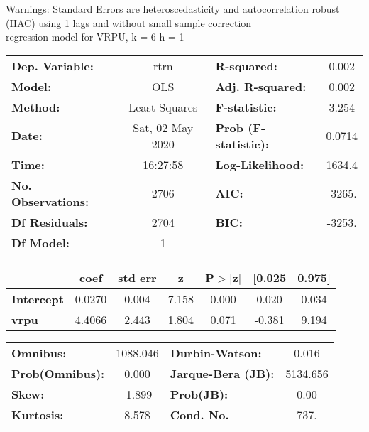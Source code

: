 Warnings: \newline
 [1] Standard Errors are heteroscedasticity and autocorrelation robust (HAC) using 1 lags and without small sample correction\\ 

regression model for VRPU, k = 6 h = 1\begin{center}
\begin{tabular}{lclc}
\toprule
\textbf{Dep. Variable:}    &       rtrn       & \textbf{  R-squared:         } &     0.002   \\
\textbf{Model:}            &       OLS        & \textbf{  Adj. R-squared:    } &     0.002   \\
\textbf{Method:}           &  Least Squares   & \textbf{  F-statistic:       } &     3.254   \\
\textbf{Date:}             & Sat, 02 May 2020 & \textbf{  Prob (F-statistic):} &   0.0714    \\
\textbf{Time:}             &     16:27:58     & \textbf{  Log-Likelihood:    } &    1634.4   \\
\textbf{No. Observations:} &        2706      & \textbf{  AIC:               } &    -3265.   \\
\textbf{Df Residuals:}     &        2704      & \textbf{  BIC:               } &    -3253.   \\
\textbf{Df Model:}         &           1      & \textbf{                     } &             \\
\bottomrule
\end{tabular}
\begin{tabular}{lcccccc}
                   & \textbf{coef} & \textbf{std err} & \textbf{z} & \textbf{P$> |$z$|$} & \textbf{[0.025} & \textbf{0.975]}  \\
\midrule
\textbf{Intercept} &       0.0270  &        0.004     &     7.158  &         0.000        &        0.020    &        0.034     \\
\textbf{vrpu}      &       4.4066  &        2.443     &     1.804  &         0.071        &       -0.381    &        9.194     \\
\bottomrule
\end{tabular}
\begin{tabular}{lclc}
\textbf{Omnibus:}       & 1088.046 & \textbf{  Durbin-Watson:     } &    0.016  \\
\textbf{Prob(Omnibus):} &   0.000  & \textbf{  Jarque-Bera (JB):  } & 5134.656  \\
\textbf{Skew:}          &  -1.899  & \textbf{  Prob(JB):          } &     0.00  \\
\textbf{Kurtosis:}      &   8.578  & \textbf{  Cond. No.          } &     737.  \\
\bottomrule
\end{tabular}
\end{center}

